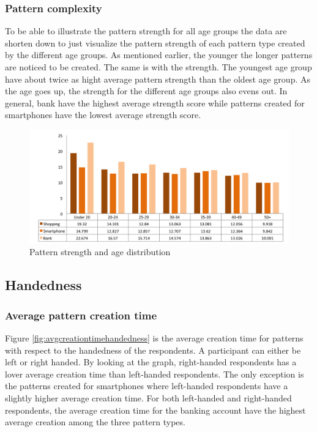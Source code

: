    \subsubsection{Pattern complexity}
    To be able to illustrate the pattern strength for all age groups the data are shorten down to just visualize the pattern strength of each pattern type created by the different age groups. As mentioned earlier, the younger the longer patterns are noticed to be created. The same is with the strength. The youngest age group have about twice as hight average pattern strength than the oldest age group. As the age goes up, the strength for the different age groups also evens out. In general, bank have the highest average strength score while patterns created for smartphones have the lowest average strength score.

    \begin{figure}[H]
      \centering
      \includegraphics[width=\textwidth]{pics/analysis/strengthagedist.png}
      \caption{Pattern strength and age distribution}
      \label{fig:strengthagedist}
    \end{figure}

	\subsection{Handedness}

    \subsubsection{Average pattern creation time}
      Figure \ref{fig:avgcreationtimehandedness} is the average creation time for patterns with respect to the handedness of the respondents. A participant can either be left or right handed. By looking at the graph, right-handed respondents has a lover average creation time than left-handed respondents. The only exception is the patterns created for smartphones where left-handed respondents have a slightly higher average creation time. 
      For both left-handed and right-handed respondents, the average creation time for the banking account have the highest average creation among the three pattern types. 

